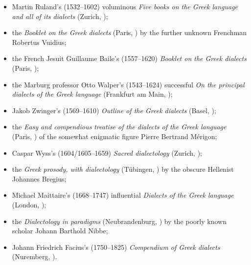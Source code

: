 {\sloppy\begin{itemize}
\item 
Martin Ruland’s (1532–1602) voluminous \textit{Five books on the Greek language and all of its dialects} (Zurich, \citeyear{Ruland1556});

\item 
the \textit{Booklet on the Greek dialects} (Paris, \citeyear{Vuidius1569}) by the further unknown Frenchman Robertus Vuidius;

\item 
the French Jesuit Guillaume Baile’s (1557–1620) \textit{Booklet on the Greek dialects} (Paris, \citeyear{Baile1588});

\item 
the Marburg professor Otto Walper’s (1543–1624) successful \textit{On the principal dialects of the Greek language} (Frankfurt am Main, \citeyear{Walper1589});

\item 
Jakob Zwinger’s (1569–1610) \textit{Outline of the Greek dialects} (Basel, \citeyear{Zwinger1605});

\item 
the \textit{Easy and compendious treatise of the dialects of the Greek language} (Paris, \citeyear{Merigon1621}) of the somewhat enigmatic figure Pierre Bertrand Mérigon;

\item 
Caspar Wyss’s (1604/1605–1659) \textit{Sacred dialectology} (Zurich, \citeyear{Wyss1650});

\item 
the \textit{Greek prosody, with dialectology} (Tübingen, \citeyear{Bregius1684}) by the obscure Hellenist Johannes Bregius;

\item 
Michael Maittaire’s (1668–1747) influential \textit{Dialects of the Greek language} (London, \citeyear{Maittaire1706});

\item 
the \textit{Dialectology in paradigms} (Neubrandenburg, \citeyear{Nibbe1755}) by the poorly known scholar Johann Barthold Nibbe;

\item 
Johann Friedrich Facius’s (1750–1825) \textit{Compendium of Greek dialects} (Nuremberg, \citeyear{Facius1782}).
\end{itemize}}

